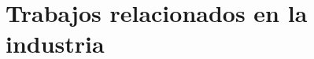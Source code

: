 \section{Trabajos relacionados en la industria}
\label{section:relaccionados-industria}

\tinylipsum
